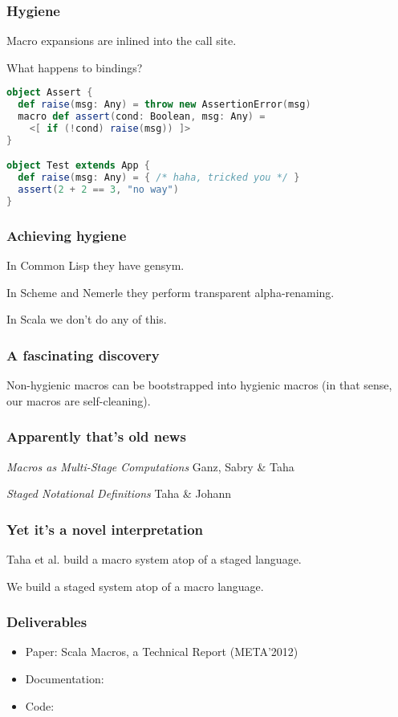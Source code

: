 \documentclass[hyperref={bookmarks=false}]{beamer}
\begin{document}
\begin{frame}[fragile]
\frametitle{Hygiene}

Macro expansions are inlined into the call site.

What happens to bindings?

\begin{lstlisting}[language=scala]
object Assert {
  def raise(msg: Any) = throw new AssertionError(msg)
  macro def assert(cond: Boolean, msg: Any) =
    <[ if (!cond) raise(msg)) ]>
}

object Test extends App {
  def raise(msg: Any) = { /* haha, tricked you */ }
  assert(2 + 2 == 3, "no way")
}
\end{lstlisting}
\end{frame}

\begin{frame}[fragile]
\frametitle{Achieving hygiene}

In Common Lisp they have gensym.

In Scheme and Nemerle they perform transparent alpha-renaming.

In Scala we don't do any of this.
\end{frame}

\begin{frame}[fragile]
\frametitle{A fascinating discovery}

Non-hygienic macros can be bootstrapped into hygienic macros
(in that sense, our macros are self-cleaning).
\end{frame}

\begin{frame}[fragile]
\frametitle{Apparently that's old news}

\emph{Macros as Multi-Stage Computations} Ganz, Sabry \& Taha

\emph{Staged Notational Definitions} Taha \& Johann
\end{frame}

\begin{frame}[fragile]
\frametitle{Yet it's a novel interpretation}

Taha et al. build a macro system atop of a staged language.

We build a staged system atop of a macro language.
\end{frame}

\begin{frame}[fragile]
\frametitle{Deliverables}

\begin{itemize}
\item Paper: Scala Macros, a Technical Report (META'2012)
\item Documentation: 
\item Code: 
\end{itemize}
\end{frame}
\end{document}

